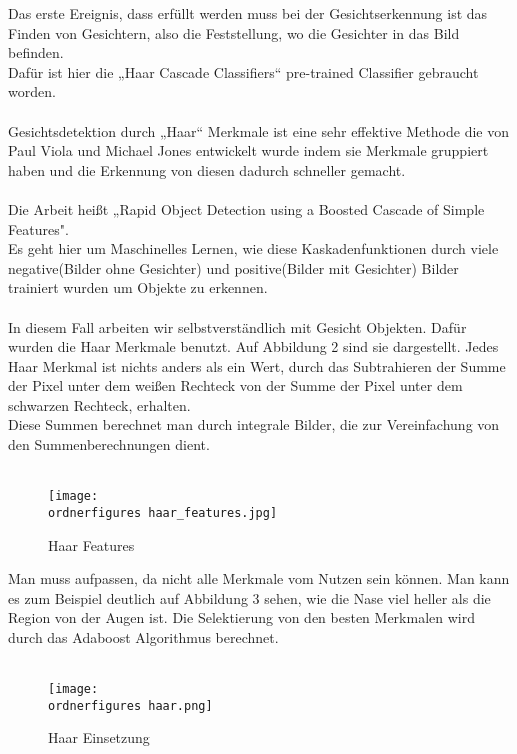 Das erste Ereignis, dass erfüllt werden muss bei der Gesichtserkennung ist das Finden von Gesichtern, also die Feststellung, wo die Gesichter in das Bild befinden. \\ 
Dafür ist hier die „Haar Cascade Classifiers“  pre-trained Classifier gebraucht worden. \\ \\
Gesichtsdetektion durch „Haar“ Merkmale ist eine sehr effektive Methode die von Paul Viola und Michael Jones entwickelt wurde indem sie Merkmale gruppiert haben und die Erkennung von diesen dadurch schneller gemacht. \\ \\
Die Arbeit heißt „Rapid Object Detection using a Boosted Cascade of Simple Features".\\

Es geht hier um Maschinelles Lernen, wie diese Kaskadenfunktionen durch viele negative(Bilder ohne Gesichter) und positive(Bilder mit Gesichter) Bilder trainiert wurden um Objekte zu erkennen.\\ \\
In diesem Fall  arbeiten wir selbstverständlich mit Gesicht Objekten. 
Dafür wurden die Haar Merkmale benutzt. Auf Abbildung 2 sind sie dargestellt. Jedes Haar Merkmal ist nichts anders als ein Wert, durch das Subtrahieren der Summe der Pixel unter dem weißen Rechteck von der Summe der Pixel unter dem schwarzen Rechteck, erhalten. \\
Diese Summen berechnet man durch integrale Bilder, die zur Vereinfachung von den Summenberechnungen dient.\\ \\
\cite{Viola01robustreal-time}

\begin{figure}[H]
	\texttt{[image: \\ordnerfigures haar\_features.jpg]}
	\caption{Haar Features}
	\label{fig:haar features}
	\cite{Viola01robustreal-time}
\end{figure}

Man muss aufpassen, da nicht alle Merkmale vom Nutzen sein können. Man kann es zum Beispiel deutlich auf Abbildung 3 sehen, wie die Nase viel heller als die Region von der Augen ist. Die Selektierung von den besten Merkmalen wird durch das Adaboost Algorithmus berechnet. \\\\
\begin{figure}[H]
	\texttt{[image: \\ordnerfigures haar.png]}
	\caption{Haar Einsetzung}
	\label{fig:haar}
	\cite{Viola01robustreal-time}
\end{figure}

